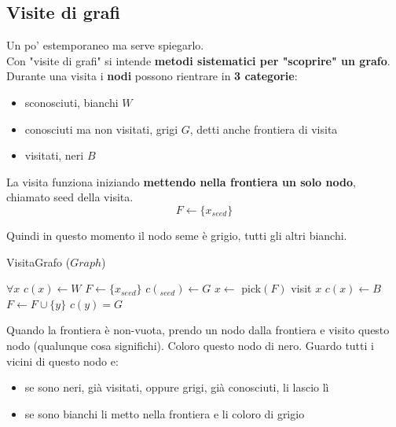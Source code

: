 \documentclass[11pt]{article}
\begin{document}
	\newpage
	
	\subsection*{Visite di grafi}
	Un po' estemporaneo ma serve spiegarlo.\\
	
	 Con "visite di grafi" si intende \textbf{metodi sistematici per "scoprire" un grafo}. Durante una visita i \textbf{nodi} possono rientrare in \textbf{3 categorie}:
	 \begin{itemize}
	 	\item sconosciuti, bianchi $W$ 
	 	\item conosciuti ma non visitati, grigi $G$, detti anche frontiera di visita
	 	\item visitati, neri $B$
	 \end{itemize}
	
	La visita funziona iniziando \textbf{mettendo nella frontiera un solo nodo}, chiamato seed della visita. 
	$$ F \leftarrow \{x_{seed}\}$$
	
	Quindi in questo momento il nodo seme è grigio, tutti gli altri bianchi.
	\begin{algorithm}
		\caption{VisitaGrafo ($Graph$)}
		\begin{algorithmic}
			\STATE $\forall x$ $c(x) \leftarrow W$
			\STATE $F \leftarrow \{x_{seed}\}$
			\STATE $c (_{seed}) \leftarrow G$
				\STATE $x \leftarrow $ pick$(F)$
				\STATE visit $x$
				\STATE $c(x) \leftarrow B$
						\STATE $F \leftarrow F \cup \{y\}$
						\STATE $c(y) = G$
					\ENDIF
				\ENDFOR
			\ENDWHILE
		\end{algorithmic}
	\end{algorithm}
		
	\newpage
		
	Quando la frontiera è non-vuota, prendo un nodo dalla frontiera e visito questo nodo (qualunque cosa significhi). Coloro questo nodo di nero. Guardo tutti i vicini di questo nodo e:
	\begin{itemize}
		\item se sono neri, già visitati, oppure grigi, già conosciuti, li lascio lì
		\item se sono bianchi li metto nella frontiera e li coloro di grigio
	\end{itemize}
	
\end{document}

